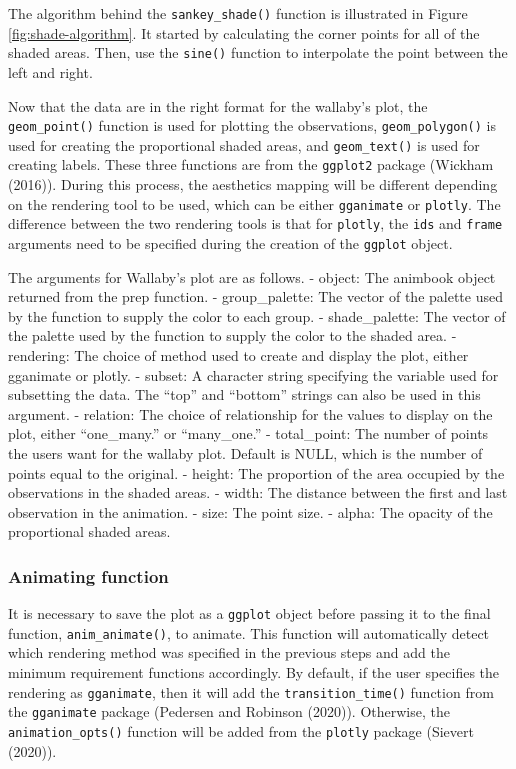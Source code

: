 The algorithm behind the \texttt{sankey\_shade()} function is illustrated in Figure \ref{fig:shade-algorithm}. It started by calculating the corner points for all of the shaded areas. Then, use the \texttt{sine()} function to interpolate the point between the left and right.

Now that the data are in the right format for the wallaby's plot, the \texttt{geom\_point()} function is used for plotting the observations, \texttt{geom\_polygon()} is used for creating the proportional shaded areas, and \texttt{geom\_text()} is used for creating labels. These three functions are from the \texttt{ggplot2} package (Wickham (2016)). During this process, the aesthetics mapping will be different depending on the rendering tool to be used, which can be either \texttt{gganimate} or \texttt{plotly}. The difference between the two rendering tools is that for \texttt{plotly}, the \texttt{ids} and \texttt{frame} arguments need to be specified during the creation of the \texttt{ggplot} object.

The arguments for Wallaby's plot are as follows.
- object: The animbook object returned from the prep function.
- group\_palette: The vector of the palette used by the function to supply the color to each group.
- shade\_palette: The vector of the palette used by the function to supply the color to the shaded area.
- rendering: The choice of method used to create and display the plot, either gganimate or plotly.
- subset: A character string specifying the variable used for subsetting the data. The ``top'' and ``bottom'' strings can also be used in this argument.
- relation: The choice of relationship for the values to display on the plot, either ``one\_many.'' or ``many\_one.''
- total\_point: The number of points the users want for the wallaby plot. Default is NULL, which is the number of points equal to the original.
- height: The proportion of the area occupied by the observations in the shaded areas.
- width: The distance between the first and last observation in the animation.
- size: The point size.
- alpha: The opacity of the proportional shaded areas.

\hypertarget{animating-function}{%
\subsubsection{Animating function}\label{animating-function}}

It is necessary to save the plot as a \texttt{ggplot} object before passing it to the final function, \texttt{anim\_animate()}, to animate. This function will automatically detect which rendering method was specified in the previous steps and add the minimum requirement functions accordingly. By default, if the user specifies the rendering as \texttt{gganimate}, then it will add the \texttt{transition\_time()} function from the \texttt{gganimate} package (Pedersen and Robinson (2020)). Otherwise, the \texttt{animation\_opts()} function will be added from the \texttt{plotly} package (Sievert (2020)).


